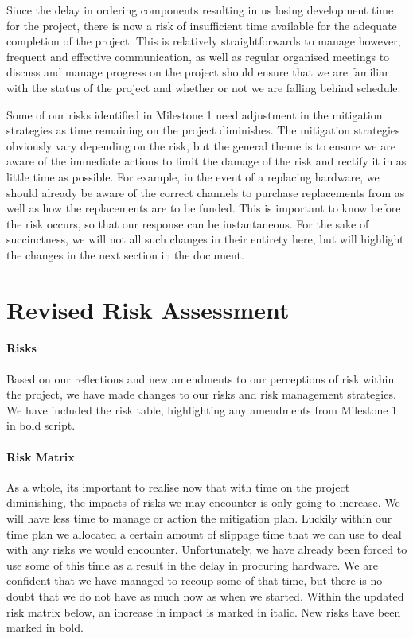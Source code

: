 Since the delay in ordering components resulting in us losing development time for the project, there is now a risk of insufficient time available for the adequate completion of the project. This is relatively straightforwards to manage however; frequent and effective communication, as well as regular organised meetings to discuss and manage progress on the project should ensure that we are familiar with the status of the project and whether or not we are falling behind schedule. 

Some of our risks identified in Milestone 1 need adjustment in the mitigation strategies as time remaining on the project diminishes. The mitigation strategies obviously vary depending on the risk, but the general theme is to ensure we are aware of the immediate actions to limit the damage of the risk and rectify it in as little time as possible. For example, in the event of a replacing hardware, we should already be aware of the correct channels to purchase replacements from as well as how the replacements are to be funded. This is important to know before the risk occurs, so that our response can be instantaneous. For the sake of succinctness, we will not all such changes in their entirety here, but will highlight the changes in the next section in the document. 

\section{Revised Risk Assessment}

\paragraph{Risks}
Based on our reflections and new amendments to our perceptions of risk within the project, we have made changes to our risks and risk management strategies. We have included the risk table, highlighting any amendments from Milestone 1 in bold script.

\vspace{3em}  \vspace{6em}

\paragraph{Risk Matrix}
As a whole, its important to realise now that with time on the project diminishing, the impacts of risks we may encounter is only going to increase. We will have less time to manage or action the mitigation plan. Luckily within our time plan we allocated a certain amount of slippage time that we can use to deal with any risks we would encounter. Unfortunately, we have already been forced to use some of this time as a result in the delay in procuring hardware. We are confident that we have managed to recoup some of that time, but there is no doubt that we do not have as much now as when we started. Within the updated risk matrix below, an increase in impact is marked in italic. New risks have been marked in bold.


\vspace{3em} 


